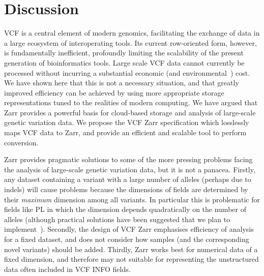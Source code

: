 \documentclass[a4paper,num-refs]{oup-contemporary}
\begin{document}
\section{Discussion}
VCF is a central element of modern genomics, facilitating
the exchange of data in a large ecosystem of interoperating tools. 
Its current row-oriented form, however,
is fundamentally inefficient,
profoundly limiting the scalability of the present generation
of bioinformatics tools. Large scale VCF data cannot 
currently be 
processed without incurring a substantial economic
(and environmental~\cite{grealey2022carbon}) cost.
We have shown here that this is not a necessary situation,
and that greatly improved efficiency can be achieved by 
using more appropriate storage representations tuned
to the realities of modern computing. We have argued that 
Zarr provides a powerful basis for cloud-based
storage and analysis of large-scale genetic variation data.
We propose the VCF Zarr specification which losslessly
maps VCF data to Zarr, and provide an efficient and scalable
tool to perform conversion.

Zarr provides pragmatic solutions to some of the more pressing 
problems facing the analysis of large-scale genetic variation
data, but it is not a panacea. Firstly, 
any dataset containing a variant with a large number of alleles
(perhaps due to indels) will cause problems because the 
dimensions of fields are determined by their \emph{maximum}
dimension among all variants. In particular this is problematic
for fields like PL in which the dimension depends 
quadratically on the number of alleles (although practical
solutions have been suggested that we plan to 
implement~\cite{poterba2024scalable}).
Secondly, the design of 
VCF Zarr emphasises efficiency of analysis for a fixed 
dataset, and does not consider how samples (and the 
corresponding novel variants) should be added.
Thirdly, Zarr works best for numerical data of a fixed 
dimension, and therefore may not suitable for representing
the unstructured data often included in VCF INFO fields.
\end{document}
